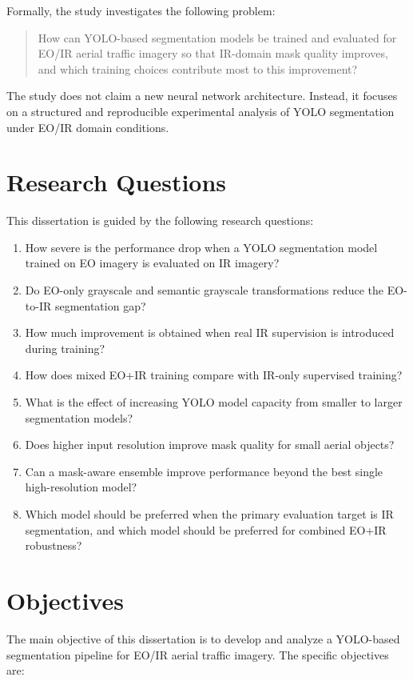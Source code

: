 Formally, the study investigates the following problem:

\begin{quote}
How can YOLO-based segmentation models be trained and evaluated for EO/IR aerial traffic imagery so that IR-domain mask quality improves, and which training choices contribute most to this improvement?
\end{quote}

The study does not claim a new neural network architecture. Instead, it focuses on a structured and reproducible experimental analysis of YOLO segmentation under EO/IR domain conditions.

\section{Research Questions}

This dissertation is guided by the following research questions:

\begin{enumerate}
    \item How severe is the performance drop when a YOLO segmentation model trained on EO imagery is evaluated on IR imagery?
    \item Do EO-only grayscale and semantic grayscale transformations reduce the EO-to-IR segmentation gap?
    \item How much improvement is obtained when real IR supervision is introduced during training?
    \item How does mixed EO+IR training compare with IR-only supervised training?
    \item What is the effect of increasing YOLO model capacity from smaller to larger segmentation models?
    \item Does higher input resolution improve mask quality for small aerial objects?
    \item Can a mask-aware ensemble improve performance beyond the best single high-resolution model?
    \item Which model should be preferred when the primary evaluation target is IR segmentation, and which model should be preferred for combined EO+IR robustness?
\end{enumerate}

\section{Objectives}

The main objective of this dissertation is to develop and analyze a YOLO-based segmentation pipeline for EO/IR aerial traffic imagery. The specific objectives are:

